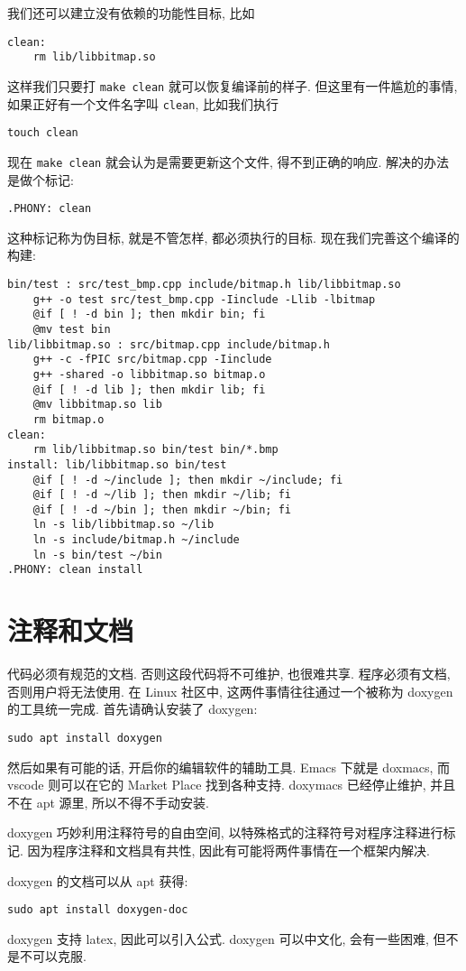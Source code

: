 \documentclass[a4paper]{ctexart}
\begin{document}
我们还可以建立没有依赖的功能性目标, 比如
\begin{verbatim}
clean:
	rm lib/libbitmap.so
\end{verbatim}
这样我们只要打 \verb|make clean| 就可以恢复编译前的样子.
但这里有一件尴尬的事情, 如果正好有一个文件名字叫 \verb|clean|, 比如我们执行
\begin{verbatim}
touch clean
\end{verbatim}
现在 \verb|make clean| 就会认为是需要更新这个文件, 得不到正确的响应. 解决的办法是做个标记:
\begin{verbatim}
.PHONY: clean
\end{verbatim}
这种标记称为伪目标, 就是不管怎样, 都必须执行的目标. 现在我们完善这个编译的构建:
\begin{verbatim}
bin/test : src/test_bmp.cpp include/bitmap.h lib/libbitmap.so
	g++ -o test src/test_bmp.cpp -Iinclude -Llib -lbitmap 
	@if [ ! -d bin ]; then mkdir bin; fi
	@mv test bin
lib/libbitmap.so : src/bitmap.cpp include/bitmap.h 
	g++ -c -fPIC src/bitmap.cpp -Iinclude 
	g++ -shared -o libbitmap.so bitmap.o
	@if [ ! -d lib ]; then mkdir lib; fi
	@mv libbitmap.so lib
	rm bitmap.o
clean:
	rm lib/libbitmap.so bin/test bin/*.bmp
install: lib/libbitmap.so bin/test
	@if [ ! -d ~/include ]; then mkdir ~/include; fi
	@if [ ! -d ~/lib ]; then mkdir ~/lib; fi
	@if [ ! -d ~/bin ]; then mkdir ~/bin; fi
	ln -s lib/libbitmap.so ~/lib
	ln -s include/bitmap.h ~/include
	ln -s bin/test ~/bin
.PHONY: clean install
\end{verbatim}

\section{注释和文档}

代码必须有规范的文档. 否则这段代码将不可维护, 也很难共享. 程序必须有文档, 否则用户将无法使用.
在 Linux 社区中, 这两件事情往往通过一个被称为 doxygen 的工具统一完成.
首先请确认安装了 doxygen:
\begin{verbatim}
sudo apt install doxygen
\end{verbatim}
然后如果有可能的话, 开启你的编辑软件的辅助工具. Emacs 下就是 doxmacs, 而 vscode 则可以在它的
Market Place 找到各种支持. doxymacs 已经停止维护, 并且不在 apt 源里, 所以不得不手动安装.

doxygen 巧妙利用注释符号的自由空间, 以特殊格式的注释符号对程序注释进行标记. 因为程序注释和文档具有共性,
因此有可能将两件事情在一个框架内解决.

doxygen 的文档可以从 apt 获得:
\begin{verbatim}
sudo apt install doxygen-doc
\end{verbatim}

doxygen 支持 latex, 因此可以引入公式. doxygen 可以中文化, 会有一些困难, 但不是不可以克服.



\end{document}
